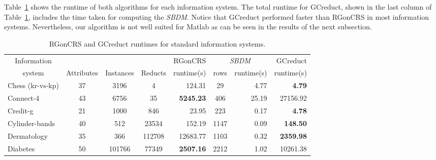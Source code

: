 \documentclass[authoryear,preprint,review,12pt]{elsarticle}
\begin{document}
	Table~\ref{tab:matlab} shows the runtime of both algorithms for each information system. The total runtime for GCreduct, shown in the last column of Table~\ref{tab:matlab}, includes the time taken for computing the \textit{SBDM}. Notice that GCreduct performed faster than RGonCRS in most information systems. Nevertheless, our algorithm is not well suited for Matlab as can be seen in the results of the next subsection.
	\begin{table}[!htb]
		\setlength{\tabcolsep}{3pt}
		\caption{RGonCRS and GCreduct runtimes for standard information systems.}\label{tab:matlab}
		\centering \footnotesize
		\begin{tabular}{|l|c|c|c|r|c|r|r|}
			\hline
			\multicolumn{1}{|c|}{Information}&&&& RGonCRS & \multicolumn{2}{c|}{\textit{SBDM}} & GCreduct\\ %
			\cline{6-7}
			\multicolumn{1}{|c|}{system} & Attributes & Instances & Reducts & \multicolumn{1}{c|}{runtime(s)} & rows & runtime(s) & \multicolumn{1}{c|}{runtime(s)}\\ %
			\hline
			Chess (kr-vs-kp)          & 37         & 3196      & 4        & 124.31            & 29    & 4.77        & \textbf{4.79}      \\
			Connect-4                 & 43         & 6756      & 35       & \textbf{5245.23}  & 406   & 25.19       & 27156.92           \\
			Credit-g                  & 21         & 1000      & 846      & 23.95             & 223   & 0.17        & \textbf{4.78}      \\
			Cylinder-bands            & 40         & 512       & 23534    & 152.19            & 1147  & 0.09        & \textbf{148.50}    \\
			Dermatology               & 35         & 366       & 112708   & 12683.77          & 1103  & 0.32        & \textbf{2359.98}   \\
			Diabetes                  & 50         & 101766    & 77349    & \textbf{2507.16}  & 2212  & 1.02        & 10261.38           \\

\end{tabular}
\end{table}
\end{document}
